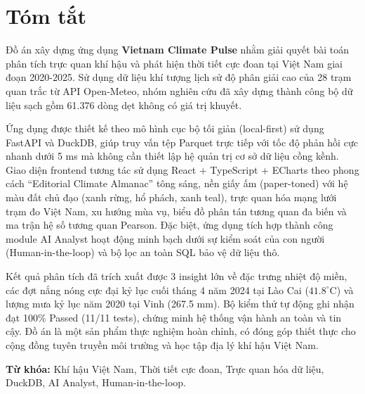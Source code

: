 \chapter*{Tóm tắt}

Đồ án xây dựng ứng dụng \textbf{Vietnam Climate Pulse} nhằm giải quyết bài toán phân tích trực quan khí hậu và phát hiện thời tiết cực đoan tại Việt Nam giai đoạn 2020-2025. Sử dụng dữ liệu khí tượng lịch sử độ phân giải cao của 28 trạm quan trắc từ API Open-Meteo, nhóm nghiên cứu đã xây dựng thành công bộ dữ liệu sạch gồm 61.376 dòng dẹt không có giá trị khuyết. 

Ứng dụng được thiết kế theo mô hình cục bộ tối giản (local-first) sử dụng FastAPI và DuckDB, giúp truy vấn tệp Parquet trực tiếp với tốc độ phản hồi cực nhanh dưới 5 ms mà không cần thiết lập hệ quản trị cơ sở dữ liệu cồng kềnh. Giao diện frontend tương tác sử dụng React + TypeScript + ECharts theo phong cách ``Editorial Climate Almanac'' tông sáng, nền giấy ấm (paper-toned) với hệ màu đất chủ đạo (xanh rừng, hổ phách, xanh teal), trực quan hóa mạng lưới trạm đo Việt Nam, xu hướng mùa vụ, biểu đồ phân tán tương quan đa biến và ma trận hệ số tương quan Pearson. Đặc biệt, ứng dụng tích hợp thành công module AI Analyst hoạt động minh bạch dưới sự kiểm soát của con người (Human-in-the-loop) và bộ lọc an toàn SQL bảo vệ dữ liệu thô. 

Kết quả phân tích đã trích xuất được 3 insight lớn về đặc trưng nhiệt độ miền, các đợt nắng nóng cực đại kỷ lục cuối tháng 4 năm 2024 tại Lào Cai ($41.8^\circ$C) và lượng mưa kỷ lục năm 2020 tại Vinh (267.5 mm). Bộ kiểm thử tự động ghi nhận đạt 100\% Passed (11/11 tests), chứng minh hệ thống vận hành an toàn và tin cậy. Đồ án là một sản phẩm thực nghiệm hoàn chỉnh, có đóng góp thiết thực cho cộng đồng tuyên truyền môi trường và học tập địa lý khí hậu Việt Nam.

\vspace{0.5cm}
\noindent\textbf{Từ khóa:} Khí hậu Việt Nam, Thời tiết cực đoan, Trực quan hóa dữ liệu, DuckDB, AI Analyst, Human-in-the-loop.
